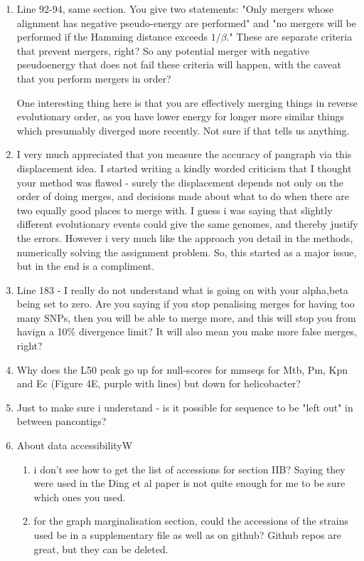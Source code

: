 \documentclass{article}
\begin{document}
\begin{enumerate}
    \item Line 92-94, same section. You give two statements:
          "Only mergers whose alignment has negative pseudo-energy are performed"
          and
          "no mergers will be performed if the Hamming distance exceeds $1/\beta$."
          These are separate criteria that prevent mergers, right? So any potential merger with negative pseudoenergy that does not fail these criteria will happen, with the caveat that you perform mergers in order?

          One interesting thing here is that you are effectively merging things in reverse evolutionary order, as you have lower energy for longer more similar things which presumably diverged more recently. Not sure if that tells us anything.

    \item I very much appreciated that you measure the accuracy of pangraph via this displacement idea. I started writing a kindly worded criticism that I thought your method was flawed - surely the displacement depends not only on the order of doing merges, and decisions made about what to do when there are two equally good places to merge with. I guess i was saying that slightly different evolutionary events could give the same genomes, and thereby justify the errors. However i very much like the approach you detail in the methods, numerically solving the assignment problem. So, this started as a major issue, but in the end is a compliment.

    \item Line 183 - I really do not understand what is going on with your alpha,beta being set to zero. Are you saying if you stop penalising merges for having too many SNPs, then you will be able to merge more, and this will stop you from havign a 10\% divergence limit? It will also mean you make more false merges, right?

    \item Why does the L50 peak go up for null-scores for mmseqs for Mtb, Pm, Kpn and Ec (Figure 4E, purple with lines) but down for helicobacter?

    \item Just to make sure i understand - is it possible for sequence to be "left out" in between pancontigs?

    \item About data accessibilityW
          \begin{enumerate}
              \item i don't see how to get the list of accessions for section IIB? Saying they were used in the Ding et al paper is not quite enough for me to be sure which ones you used.
              \item for the graph marginalisation section, could the accessions of the strains used be in a supplementary file as well as on github? Github repos are great, but they can be deleted.
          \end{enumerate}
\end{enumerate}
\end{document}
